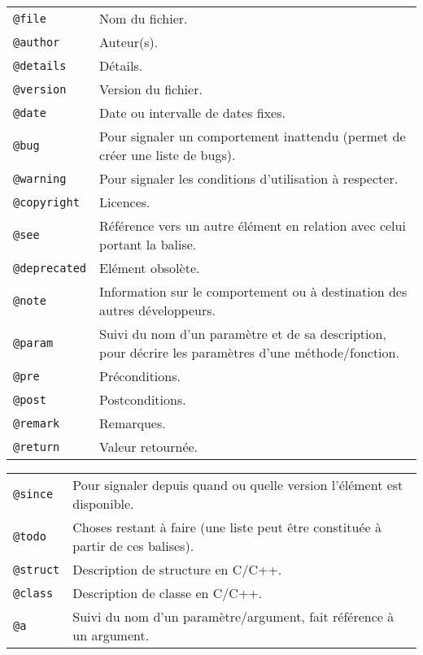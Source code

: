     \noindent
    \begin{tabular}{p{}p{}}
      \texttt{@file}   & Nom du fichier.\\
      \texttt{@author} & Auteur(s).\\
      \texttt{@details} & Détails.\\
      \texttt{@version} & Version du fichier.\\
      \texttt{@date}    & Date ou intervalle de dates fixes.\\
      \texttt{@bug}     & Pour signaler un comportement inattendu (permet de créer une liste de bugs).\\
      \texttt{@warning} & Pour signaler les conditions d'utilisation à respecter.\\
      \texttt{@copyright} & Licences.\\ 
      \texttt{@see} & Référence vers un autre élément en relation avec celui portant la balise.\\
      \texttt{@deprecated} & Elément obsolète.\\
      \texttt{@note} & Information sur le comportement ou à destination des autres développeurs.\\
      \texttt{@param} & Suivi du nom d'un paramètre et de sa description, pour décrire les paramètres d'une méthode/fonction. \\
      \texttt{@pre} & Préconditions. \\
      \texttt{@post} & Postconditions. \\
      \texttt{@remark} & Remarques. \\
      \texttt{@return} & Valeur retournée. \\
    \end{tabular}

    \noindent
    \begin{tabular}{p{}p{}}
      \texttt{@since} & Pour signaler depuis quand ou quelle version l'élément est disponible. \\
      \texttt{@todo} & Choses restant à faire (une liste peut être constituée à partir de ces balises). \\
      \texttt{@struct} & Description de structure en C/C++.\\
      \texttt{@class} & Description de classe en C/C++.\\
      \texttt{@a} & Suivi du nom d'un paramètre/argument, fait référence à un argument.
    \end{tabular}

